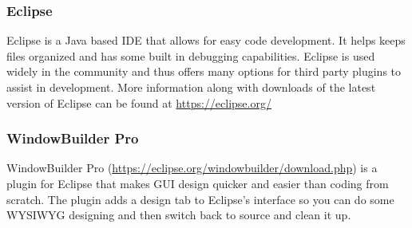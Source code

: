 \documentclass[letterpaper,12pt]{article}
\begin{document}
	\subsubsection*{Eclipse}
		Eclipse is a Java based IDE that allows for easy code development. It helps keeps files organized and has some built in debugging capabilities. Eclipse is used widely in the community and thus offers many options for third party plugins to assist in development. More information along with downloads of the latest version of Eclipse can be found at \url{https://eclipse.org/}
		
	\subsubsection*{WindowBuilder Pro}
		WindowBuilder Pro (\url{https://eclipse.org/windowbuilder/download.php}) is a plugin for Eclipse that makes GUI design quicker and easier than coding from scratch. The plugin adds a design tab to Eclipse's interface so you can do some WYSIWYG designing and then switch back to source and clean it up. 
		
	
	
\end{document}
